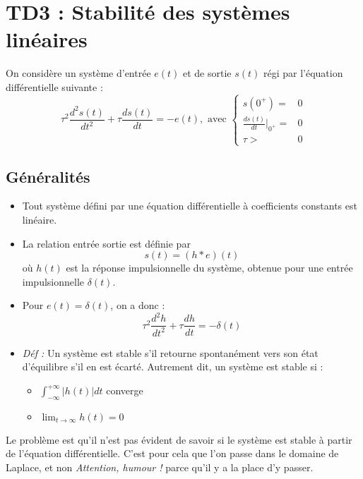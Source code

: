 \documentclass[../../Cours_M1.tex]{subfiles}
\newcommand{\nomTD}{TD3 : Stabilité des systèmes linéaires}
\begin{document}
\section*{\nomTD}


On considère un système d'entrée $e(t)$ et de sortie $s(t)$ régi par l'équation différentielle suivante :
\[ \tau^2\frac{d^2s(t)}{dt^2} + \tau\frac{ds(t)}{dt} = -e(t), \text{ avec }
\left\{
\begin{array}{rl}
s(0^+) = & 0 \\
\frac{ds(t)}{dt} |_{0^+} = & 0 \\
\tau > & 0
\end{array}
\right.
\]

\subsection*{Généralités}
\begin{itemize}
\item Tout système défini par une équation différentielle à coefficients constants est linéaire.
\item La relation entrée sortie est définie par \[ s(t) = (h*e)(t) \] où $h(t)$ est la réponse impulsionnelle du système, obtenue pour une entrée impulsionnelle $\delta(t)$.
\item Pour $e(t) = \delta(t)$, on a donc :
\[ \tau^2 \frac{d^2h}{dt^2} + \tau \frac{dh}{dt} = -\delta(t) \]
\item \textit{Déf :} Un système est stable s'il retourne spontanément vers son état d'équilibre s'il en est écarté.
Autrement dit, un système est stable si : 
\begin{itemize}
\item $\int_{-\infty}^{+\infty} |h(t)| dt$ converge
\item $\lim_{t\rightarrow\infty} h(t) = 0$
\end{itemize}
\end{itemize}

Le problème est qu'il n'est pas évident de savoir si le système est stable à partir de l'équation différentielle. C'est pour cela que l'on passe dans le domaine de Laplace, et non \textit{Attention, humour !} parce qu'il y a la place d'y passer.
\end{document}

